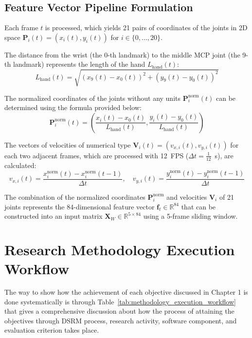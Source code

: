 \subsection{Feature Vector Pipeline Formulation}
\label{subsec:meth_feature_vector}
Each frame $t$ is processed, which yields 21 pairs of coordinates of the joints in 2D space $\mathbf{P}_i(t) = (x_i(t), y_i(t))$ for $i \in \{0, \dots, 20\}$.

The distance from the wrist (the 0-th landmark) to the middle MCP joint (the 9-th landmark) represents the length of the hand $L_{\text{hand}}(t)$:
\begin{equation}
L_{\text{hand}}(t) = \sqrt{(x_9(t) - x_0(t))^2 + (y_9(t) - y_0(t))^2}
\label{eq:meth_hand_length}
\end{equation}

The normalized coordinates of the joints without any units $\mathbf{P}_i^{\text{norm}}(t)$ can be determined using the formula provided below:
\begin{equation}
\mathbf{P}_i^{\text{norm}}(t) = \left( \frac{x_i(t) - x_0(t)}{L_{\text{hand}}(t)}, \frac{y_i(t) - y_0(t)}{L_{\text{hand}}(t)} \right)
\label{eq:meth_norm_coords}
\end{equation}

The vectors of velocities of numerical type $\mathbf{V}_i(t) = (v_{x,i}(t), v_{y,i}(t))$ for each two adjacent frames, which are processed with 12~FPS ($\Delta t = \frac{1}{12}$~s), are calculated:
\begin{equation}
v_{x,i}(t) = \frac{x_i^{\text{norm}}(t) - x_i^{\text{norm}}(t-1)}{\Delta t}, \quad
v_{y,i}(t) = \frac{y_i^{\text{norm}}(t) - y_i^{\text{norm}}(t-1)}{\Delta t}
\label{eq:meth_velocity}
\end{equation}

The combination of the normalized coordinates $\mathbf{P}_i^{\text{norm}}$ and velocities $\mathbf{V}_i$ of 21 joints represents the 84-dimensional feature vector $\mathbf{f}_t \in \mathbb{R}^{84}$ that can be constructed into an input matrix $\mathbf{X}_W \in \mathbb{R}^{5 \times 84}$ using a 5-frame sliding window.

\section{Research Methodology Execution Workflow}
\label{sec:meth_workflow}
The way to show how the achievement of each objective discussed in Chapter 1 is done systematically is through Table~\ref{tab:methodology_execution_workflow} that gives a comprehensive discussion about how the process of attaining the objectives through DSRM process, research activity, software component, and evaluation criterion takes place.

